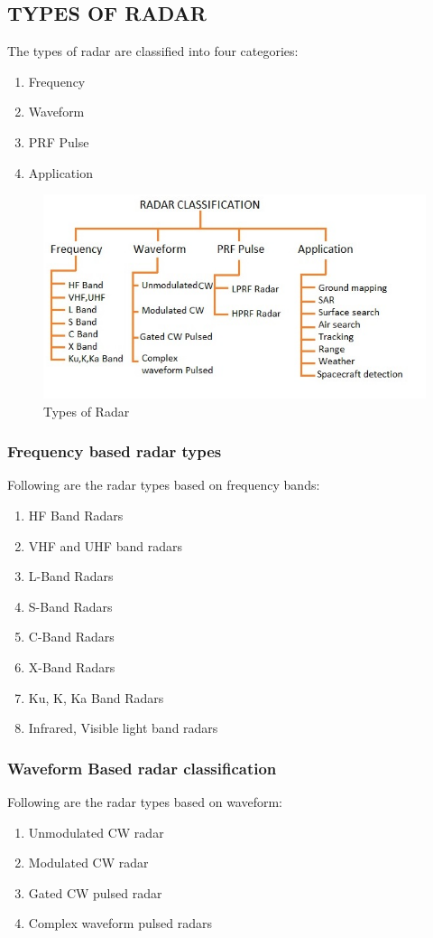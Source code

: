 \documentclass[14pt]{article} %
\begin{document}
\subsection{ TYPES OF RADAR}
\noindent The types of radar are classified into four categories:
\begin{enumerate}
\item	Frequency 
\item	Waveform 
\item	PRF Pulse 
\item	Application
\end{enumerate}
 \begin{figure}[H]
  \includegraphics[width=\linewidth]{radartypes.png}
  \caption{ Types of Radar}
  \label{fig:figure 10}
\end{figure}

\subsubsection{Frequency based radar types}
\noindent  Following are the radar types based on frequency bands:
 \begin{enumerate}
\item	HF Band Radars
\item	VHF and UHF band radars
\item	L-Band Radars
\item	S-Band Radars 
\item	C-Band Radars 
\item	X-Band Radars 
\item	Ku, K, Ka Band Radars 
\item	Infrared, Visible light band radars
\end{enumerate}

\subsubsection{Waveform Based radar classification}
 \noindent Following are the radar types based on waveform:
\begin{enumerate}
\item	Unmodulated CW radar
\item	Modulated CW radar
\item	Gated CW pulsed radar
\item	Complex waveform pulsed radars
\end{enumerate}
\end{document}
